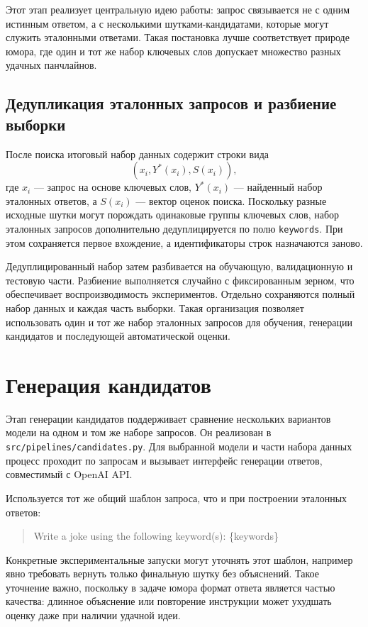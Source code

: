 Этот этап реализует центральную идею работы: запрос связывается не с одним истинным ответом, а с несколькими шутками-кандидатами, которые могут служить эталонными ответами. Такая постановка лучше соответствует природе юмора, где один и тот же набор ключевых слов допускает множество разных удачных панчлайнов.

\subsection{Дедупликация эталонных запросов и разбиение выборки}

После поиска итоговый набор данных содержит строки вида
\[
    (x_i, Y^{*}(x_i), S(x_i)),
\]
где \(x_i\) --- запрос на основе ключевых слов, \(Y^{*}(x_i)\) --- найденный набор эталонных ответов, а \(S(x_i)\) --- вектор оценок поиска. Поскольку разные исходные шутки могут порождать одинаковые группы ключевых слов, набор эталонных запросов дополнительно дедуплицируется по полю \texttt{keywords}. При этом сохраняется первое вхождение, а идентификаторы строк назначаются заново.

Дедуплицированный набор затем разбивается на обучающую, валидационную и тестовую части. Разбиение выполняется случайно с фиксированным зерном, что обеспечивает воспроизводимость экспериментов. Отдельно сохраняются полный набор данных и каждая часть выборки. Такая организация позволяет использовать один и тот же набор эталонных запросов для обучения, генерации кандидатов и последующей автоматической оценки.

\section{Генерация кандидатов}

Этап генерации кандидатов поддерживает сравнение нескольких вариантов модели на одном и том же наборе запросов. Он реализован в \texttt{src/pipelines/candidates.py}. Для выбранной модели и части набора данных процесс проходит по запросам и вызывает интерфейс генерации ответов, совместимый с OpenAI API.

Используется тот же общий шаблон запроса, что и при построении эталонных ответов:
\begin{quote}
    \ttfamily Write a joke using the following keyword(s): \{keywords\}
\end{quote}
Конкретные экспериментальные запуски могут уточнять этот шаблон, например явно требовать вернуть только финальную шутку без объяснений. Такое уточнение важно, поскольку в задаче юмора формат ответа является частью качества: длинное объяснение или повторение инструкции может ухудшать оценку даже при наличии удачной идеи.


